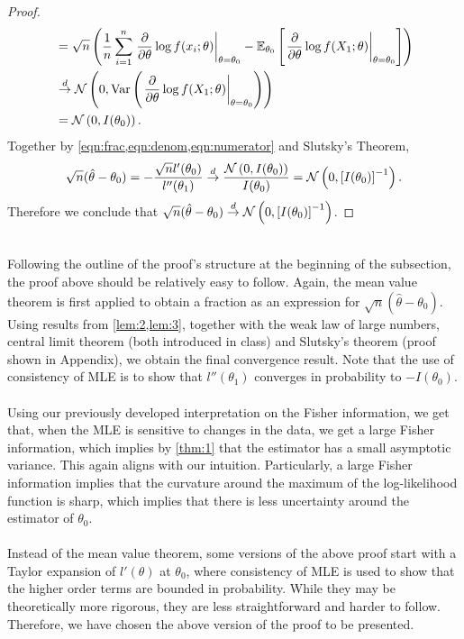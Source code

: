 \begin{proof}
\begin{align}
&= \sqrt{n}\left( \frac{1}{n}\sum_{i=1}^n \left.\frac{\partial}{\partial\theta}\log f(x_i;\theta)\right\vert_{\theta=\theta_0} - \mathbb{E}_{\theta_0}\left[ \left.\frac{\partial}{\partial\theta}\log f(X_1;\theta)\right\vert_{\theta=\theta_0} \right] \right)\nonumber\\
&\overset{d}{\rightarrow} \mathcal{N}\left(0, \text{Var}\left( \left.\frac{\partial}{\partial\theta}\log f(X_1;\theta)\right\vert_{\theta=\theta_0} \right)\right)\nonumber\\
&= \mathcal{N}\left( 0, I(\theta_0) \right). \label{eqn:numerator}
\end{align}
Together by \cref{eqn:frac,eqn:denom,eqn:numerator} and Slutsky's Theorem,
\begin{align*}
\sqrt{n}(\hat{\theta} - \theta_0) = -\frac{\sqrt{n}l'(\theta_0)}{l''(\theta_1)} \overset{d}{\rightarrow} \frac{\mathcal{N}\left(0,I(\theta_0)\right)}{I(\theta_0)} = \mathcal{N}\left(0, \left[ I(\theta_0) \right]^{-1}\right).
\end{align*}
Therefore we conclude that $\sqrt{n}(\hat{\theta} - \theta_0)\overset{d}{\rightarrow}\mathcal{N}\left(0, \left[ I(\theta_0) \right]^{-1}\right)$.
\end{proof}$ $\\
Following the outline of the proof's structure at the beginning of the subsection, the proof above should be relatively easy to follow. Again, the mean value theorem is first applied to obtain a fraction as an expression for $\sqrt{n}(\hat{\theta} - \theta_0)$. Using results from \cref{lem:2,lem:3}, together with the weak law of large numbers, central limit theorem (both introduced in class) and Slutsky's theorem (proof shown in Appendix), we obtain the final convergence result. Note that the use of consistency of MLE is to show that $l''(\theta_1)$ converges in probability to $-I(\theta_0)$.\\\\
Using our previously developed interpretation on the Fisher information, we get that, when the MLE is sensitive to changes in the data, we get a large Fisher information, which implies by \cref{thm:1} that the estimator has a small asymptotic variance. This again aligns with our intuition. Particularly, a large Fisher information implies that the curvature around the maximum of the log-likelihood function is sharp, which implies that there is less uncertainty around the estimator of $\theta_0$.\\\\
Instead of the mean value theorem, some versions of the above proof start with a Taylor expansion of $l'(\theta)$ at $\theta_0$, where consistency of MLE is used to show that the higher order terms are bounded in probability. While they may be theoretically more rigorous, they are less straightforward and harder to follow. Therefore, we have chosen the above version of the proof to be presented.\\\\
